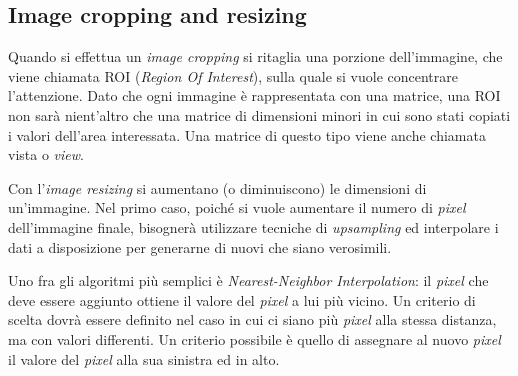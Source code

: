 % 
% 
% 
% 

\clearpage
\subsection {Image cropping and resizing}
Quando si effettua un \textit{image cropping} si ritaglia una porzione dell'immagine, che viene chiamata ROI (\textit{Region Of Interest}), sulla quale si vuole concentrare l'attenzione.
Dato che ogni immagine è rappresentata con una matrice, una ROI non sarà nient'altro che una matrice di dimensioni minori in cui sono stati copiati i valori dell'area interessata.
Una matrice di questo tipo viene anche chiamata vista o \textit{view}.

Con l'\textit{image resizing} si aumentano (o diminuiscono) le dimensioni di un'immagine.
Nel primo caso, poiché si vuole aumentare il numero di \textit{pixel} dell'immagine finale, bisognerà utilizzare tecniche di \textit{upsampling} ed interpolare i dati a disposizione per generarne di nuovi che siano verosimili.

Uno fra gli algoritmi più semplici è \textit{Nearest-Neighbor Interpolation}:
il \textit{pixel} che deve essere aggiunto ottiene il valore del \textit{pixel} a lui più vicino.
Un criterio di scelta dovrà essere definito nel caso in cui ci siano più \textit{pixel} alla stessa distanza, ma con valori differenti.
Un criterio possibile è quello di assegnare al nuovo \textit{pixel} il valore del \textit{pixel} alla sua sinistra ed in alto.

